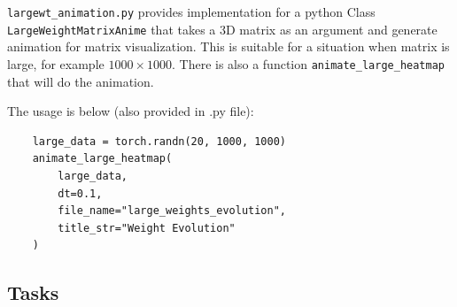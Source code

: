 \documentclass[12pt, xcolor=dvipsnames,svgnames,x11names]{article}
\begin{document}
\texttt{largewt\_animation.py} provides implementation for a python Class \texttt{LargeWeightMatrixAnime} that takes a 3D matrix as an argument and generate animation for matrix visualization. This is suitable for a situation when matrix is large, for example $1000\times 1000$.  There is also a function \texttt{animate_large_heatmap} that will do the animation.

The usage is below (also provided in .py file):

\begin{verbatim}
    large_data = torch.randn(20, 1000, 1000) 
    animate_large_heatmap(
        large_data, 
        dt=0.1,
        file_name="large_weights_evolution",
        title_str="Weight Evolution"
    )

\end{verbatim}


\subsection{Tasks}
\end{document}
